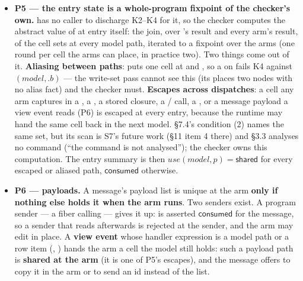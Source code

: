 \begin{itemize}
\item \textbf{P5 — the entry state is a whole-program fixpoint of the checker's own.}  has no caller to discharge K2–K4 for it, so the checker computes the abstract value of  at entry itself: the join, over 's result and every arm's result, of the cell sets at every model path, iterated to a fixpoint over the arms (one round per cell the arms can place, in practice two). Two things come out of it. \textbf{Aliasing between paths}:  puts one cell at  and , so a  on  fails K4 against $(\mathit{model},\allowbreak{}.b)$ — the write-set pass cannot see this (its  places two  nodes with no alias fact) and the checker must. \textbf{Escapes across dispatches}: a cell any arm captures in a , a , a stored closure, a / call, a , or a message payload a view event reads (P6) is escaped at every entry, because the runtime may hand the same cell back in the next model.  §7.4's condition (2) names the same set, but its scan is S7's future work (§11 item 4 there) and  §3.3 analyses no command (“the command is not analysed”); the checker owns this computation. The entry summary is then $\mathit{use}(\mathit{model},\allowbreak{}p)=\mathsf{shared}$ for every escaped or aliased path, $\mathsf{consumed}$ otherwise.
\item \textbf{P6 — payloads.} A message's payload list is unique at the arm \textbf{only if nothing else holds it when the arm runs}. Two senders exist. A program sender — a fiber calling  — gives it up:  is asserted $\mathsf{consumed}$ for the message, so a sender that reads  afterwards is rejected at the sender, and the arm may edit  in place. A \textbf{view event} whose handler expression is a model path or a row item (, ) hands the arm a cell the model still holds: such a payload path is \textbf{shared at the arm} (it is one of P5's escapes), and the message offers to copy it in the arm or to send an id instead of the list.
\end{itemize}

